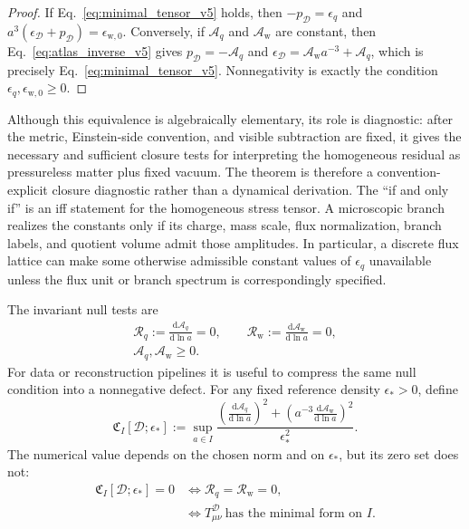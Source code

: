 \documentclass[
  aps,
  prd,
  reprint,
  superscriptaddress,
  floatfix,
  nofootinbib,
  longbibliography
]{revtex4-2}
\theoremstyle{plain}
\theoremstyle{definition}
\theoremstyle{remark}
\newcommand{\dd}{\mathrm d}
\newcommand{\D}{\mathcal D}
\newcommand{\wind}{\mathrm w}
\newcommand{\Aq}{\mathcal A_q}
\newcommand{\Aw}{\mathcal A_{\mathrm w}}
\newcommand{\Rcl}{\mathcal R}
\newcommand{\eps}{\epsilon}
\begin{document}
\begin{proof}
If Eq.~\eqref{eq:minimal_tensor_v5} holds, then
\(-p_\D=\eps_q\) and \(a^3(\eps_\D+p_\D)=\eps_{\wind,0}\).  Conversely, if
\(\Aq\) and \(\Aw\) are constant, then Eq.~\eqref{eq:atlas_inverse_v5} gives
\(p_\D=-\Aq\) and \(\eps_\D=\Aw a^{-3}+\Aq\), which is precisely
Eq.~\eqref{eq:minimal_tensor_v5}.  Nonnegativity is exactly the condition
\(\eps_q,\eps_{\wind,0}\ge0\).
\end{proof}

Although this equivalence is algebraically elementary, its role is diagnostic:
after the metric, Einstein-side convention, and visible subtraction are fixed,
it gives the necessary and sufficient closure tests for interpreting the
homogeneous residual as pressureless matter plus fixed vacuum.  The theorem is
therefore a convention-explicit closure diagnostic rather than a dynamical
derivation.  The ``if and only if'' is an iff statement for the homogeneous
stress tensor.
A microscopic branch realizes the constants only if its charge, mass scale,
flux normalization, branch labels, and quotient volume admit those amplitudes.
In particular, a discrete flux lattice can make some otherwise admissible
constant values of \(\eps_q\) unavailable unless the flux unit or branch
spectrum is correspondingly specified.

The invariant null tests are
\begin{equation}
\begin{gathered}
\Rcl_q:=\frac{\dd\Aq}{\dd\ln a}=0,
\qquad
\Rcl_{\wind}:=\frac{\dd\Aw}{\dd\ln a}=0,\\
\Aq,\Aw\ge0 .
\end{gathered}
\label{eq:null_tests_v5}
\end{equation}
For data or reconstruction pipelines it is useful to compress the same null
condition into a nonnegative defect.  For any fixed reference density
\(\eps_*>0\), define
\begin{equation}
\mathfrak C_I[\D;\eps_*]
:=
\sup_{a\in I}
\frac{
\left(\frac{\dd\Aq}{\dd\ln a}\right)^2+
\left(a^{-3}\frac{\dd\Aw}{\dd\ln a}\right)^2
}{\eps_*^2}.
\label{eq:closure_defect_v20}
\end{equation}
The numerical value depends on the chosen norm and on \(\eps_*\), but its zero
set does not:
\begin{align}
\mathfrak C_I[\D;\eps_*]=0
&\Longleftrightarrow
\Rcl_q=\Rcl_{\wind}=0,
\nonumber\\
&\Longleftrightarrow
T^\D_{\mu\nu}\ \text{has the minimal form on }I .
\label{eq:closure_defect_zero_v20}
\end{align}
\end{document}
